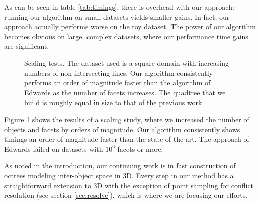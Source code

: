 \documentclass[final,3p,times,twocolumn]{elsarticle}
\begin{document}
As can be seen in table \ref{tab:timings}, there is overhead with our approach: running our algorithm on small datasets yields smaller gains. In fact, our approach actually performs worse on the toy dataset. The power of our algorithm becomes obvious on large, complex datasets, where our performance time gains are significant.

\begin{figure}
  \centering
  \caption{Scaling tests. The dataset used is a square domain with increasing numbers of non-intersecting lines.
    \protect{} Our algorithm consistently performs an order of magnitude faster than the algorithm of Edwards \etal \cite{edwards2015approximating} as the number of facets increases.
    \protect{} The quadtree that we build is roughly equal in size to that of the previous work.
  }
  \label{fig:timings}
\end{figure}

Figure \ref{fig:timings} shows the results of a scaling study, where we increased the number of objects and facets by orders of magnitude. Our algorithm consistently shows timings an order of magnitude faster than the state of the art. The approach of Edwards \etal failed on datasets with $10^6$ facets or more.

As noted in the introduction, our continuing work is in fast construction of octrees modeling inter-object space in 3D.
Every step in our method has a straightforward extension to 3D with the exception of point sampling for conflict resolution (see section \ref{sec:resolve}), which is where we are focusing our efforts.
\end{document}
